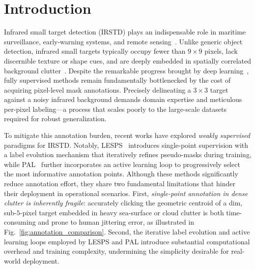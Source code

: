 
\section{Introduction}\label{sec:intro}

Infrared small target detection (IRSTD) plays an indispensable role in maritime surveillance, early-warning systems, and remote sensing~\cite{dnanet,uiunet,alcnet}.
Unlike generic object detection, infrared small targets typically occupy fewer than $9\times9$ pixels, lack discernible texture or shape cues, and are deeply embedded in spatially correlated background clutter~\cite{irstd_survey}.
Despite the remarkable progress brought by deep learning~\cite{dnanet,uiunet,sctransnet}, fully supervised methods remain fundamentally bottlenecked by the cost of acquiring pixel-level mask annotations.
Precisely delineating a $3\times3$ target against a noisy infrared background demands domain expertise and meticulous per-pixel labeling---a process that scales poorly to the large-scale datasets required for robust generalization.

To mitigate this annotation burden, recent works have explored \emph{weakly supervised} paradigms for IRSTD.
Notably, LESPS~\cite{lesps} introduces single-point supervision with a label evolution mechanism that iteratively refines pseudo-masks during training, while PAL~\cite{pal} further incorporates an active learning loop to progressively select the most informative annotation points.
Although these methods significantly reduce annotation effort, they share two fundamental limitations that hinder their deployment in operational scenarios.
First, \emph{single-point annotation in dense clutter is inherently fragile}: accurately clicking the geometric centroid of a dim, sub-$5$-pixel target embedded in heavy sea-surface or cloud clutter is both time-consuming and prone to human jittering error, as illustrated in Fig.~\ref{fig:annotation_comparison}.
Second, the iterative label evolution and active learning loops employed by LESPS and PAL introduce substantial computational overhead and training complexity, undermining the simplicity desirable for real-world deployment.

